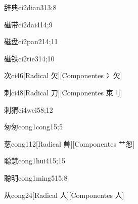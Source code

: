 \begin{verbete}{辞典}{ci2dian3}{13;8}
\end{verbete}

\begin{verbete}{磁带}{ci2dai4}{14;9}
\end{verbete}

\begin{verbete}{磁盘}{ci2pan2}{14;11}
\end{verbete}

\begin{verbete}{磁铁}{ci2tie3}{14;10}
\end{verbete}

\begin{verbete}{次}{ci4}{6}[Radical ⽋][Componentes 冫⽋]
\end{verbete}

\begin{verbete}{刺}{ci4}{8}[Radical 刀][Componentes 朿⺉]
\end{verbete}

\begin{verbete}{刺猬}{ci4wei5}{8;12}
\end{verbete}

\begin{verbete}{匆匆}{cong1cong1}{5;5}
\end{verbete}

\begin{verbete}{葱}{cong1}{12}[Radical 艸][Componentes ⺾怱]
\end{verbete}

\begin{verbete}{聪慧}{cong1hui4}{15;15}
\end{verbete}

\begin{verbete}{聪明}{cong1ming5}{15;8}
\end{verbete}

\begin{verbete}{从}{cong2}{4}[Radical ⼈][Componentes ⼈]
\end{verbete}

